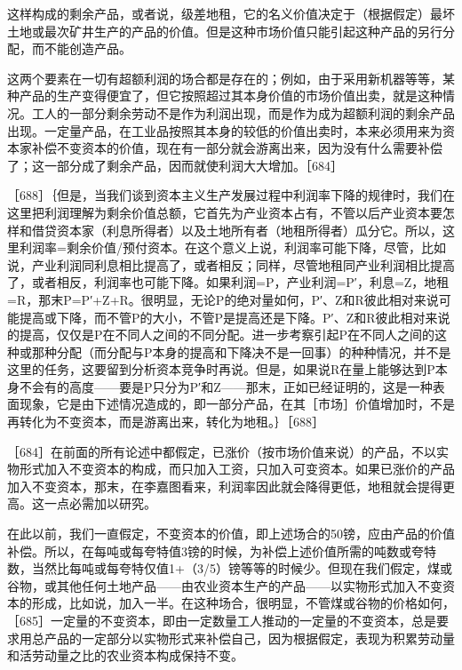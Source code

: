 这样构成的剩余产品，或者说，级差地租，它的名义价值决定于（根据假定）最坏土地或最次矿井生产的产品的价值。但是这种市场价值只能引起这种产品的另行分配，而不能创造产品。

这两个要素在一切有超额利润的场合都是存在的；例如，由于采用新机器等等，某种产品的生产变得便宜了，但它按照超过其本身价值的市场价值出卖，就是这种情况。工人的一部分剩余劳动不是作为利润出现，而是作为成为超额利润的剩余产品出现。一定量产品，在工业品按照其本身的较低的价值出卖时，本来必须用来为资本家补偿不变资本的价值，现在有一部分就会游离出来，因为没有什么需要补偿了；这一部分成了剩余产品，因而就使利润大大增加。［684］


［688］｛但是，当我们谈到资本主义生产发展过程中利润率下降的规律时，我们在这里把利润理解为剩余价值总额，它首先为产业资本占有，不管以后产业资本要怎样和借贷资本家（利息所得者）以及土地所有者（地租所得者）瓜分它。所以，这里利润率=剩余价值/预付资本。在这个意义上说，利润率可能下降，尽管，比如说，产业利润同利息相比提高了，或者相反；同样，尽管地租同产业利润相比提高了，或者相反，利润率也可能下降。如果利润=P，产业利润=P′，利息=Z，地租=R，那末P=P′+Z+R。很明显，无论P的绝对量如何，P′、Z和R彼此相对来说可能提高或下降，而不管P的大小，不管P是提高还是下降。P′、Z和R彼此相对来说的提高，仅仅是P在不同人之间的不同分配。进一步考察引起P在不同人之间的这种或那种分配（而分配与P本身的提高和下降决不是一回事）的种种情况，并不是这里的任务，这要留到分析资本竞争时再说。但是，如果说R在量上能够达到P本身不会有的高度——要是P只分为P′和Z——那末，正如已经证明的，这是一种表面现象，它是由下述情况造成的，即一部分产品，在其［市场］价值增加时，不是再转化为不变资本，而是游离出来，转化为地租。｝［688］


［684］在前面的所有论述中都假定，已涨价（按市场价值来说）的产品，不以实物形式加入不变资本的构成，而只加入工资，只加入可变资本。如果已涨价的产品加入不变资本，那末，在李嘉图看来，利润率因此就会降得更低，地租就会提得更高。这一点必需加以研究。

在此以前，我们一直假定，不变资本的价值，即上述场合的50镑，应由产品的价值补偿。所以，在每吨或每夸特值3镑的时候，为补偿上述价值所需的吨数或夸特数，当然比每吨或每夸特仅值1+（3/5）镑等等的时候少。但现在我们假定，煤或谷物，或其他任何土地产品——由农业资本生产的产品——以实物形式加入不变资本的形成，比如说，加入一半。在这种场合，很明显，不管煤或谷物的价格如何，［685］一定量的不变资本，即由一定数量工人推动的一定量的不变资本，总是要求用总产品的一定部分以实物形式来补偿自己，因为根据假定，表现为积累劳动量和活劳动量之比的农业资本构成保持不变。

